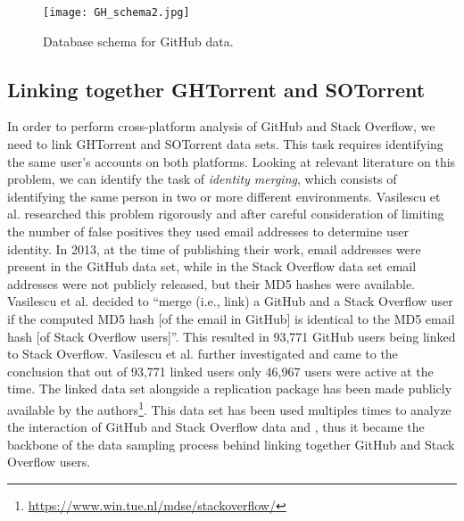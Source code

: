         \begin{figure}[!ht]
          \centering
          \texttt{[image: GH\_schema2.jpg]}\\
          \caption{Database schema for GitHub data.}
          \label{fig:gh_schema}
        \end{figure}

    \subsection{Linking together GHTorrent and SOTorrent\label{Linking_SO_GH}}
    
        In order to perform cross-platform analysis of GitHub and Stack Overflow,  we need to link  GHTorrent and SOTorrent data sets. This task requires identifying the same user's accounts on both platforms. Looking at relevant literature on this problem, we can identify the task of \textit{identity merging}, which consists of identifying the same person in two or more different environments. Vasilescu et al. \cite{vasilescu2013stackoverflow} researched this problem rigorously and after careful consideration of limiting the number of false positives they used email addresses to determine user identity. In 2013, at the time of publishing their work, email addresses were present in the GitHub data set, while in the Stack Overflow data set email addresses were not publicly released, but their MD5 hashes were available. Vasilescu et al. \cite{vasilescu2013stackoverflow} decided to ``merge (i.e., link) a GitHub and a Stack Overflow user if the computed MD5 hash [of the email in GitHub] is identical to the MD5 email hash [of Stack Overflow users]''. This resulted in 93,771 GitHub users being linked to Stack Overflow. Vasilescu et al. \cite{vasilescu2013stackoverflow} further investigated and came to the conclusion that out of 93,771 linked users only 46,967 users were active at the time. The linked data set alongside a replication package has been made publicly available by the authors\footnote{\label{bodgan_dataset}\url{https://www.win.tue.nl/mdse/stackoverflow/}}. This data set has been used multiples times to analyze the interaction of GitHub and Stack Overflow data \cite{badashian2014involvement} and \cite{lee2017github}, thus it became the backbone of the data sampling process behind linking together GitHub and Stack Overflow users.  

